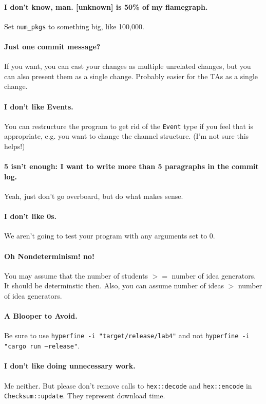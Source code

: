 \paragraph{I don't know, man. [unknown] is 50\% of my flamegraph.} Set \texttt{num\_pkgs} to something big, like 100,000.

\paragraph{Just one commit message?} If you want, you can cast your changes as multiple unrelated changes, but you can also 
present them as a single change. Probably easier for the TAs as a single change.

\paragraph{I don't like Events.} You can restructure the program to get rid of the \texttt{Event} type if you feel that is
appropriate, e.g. you want to change the channel structure. (I'm not sure this helps!)

\paragraph{5 isn't enough: I want to write more than 5 paragraphs in the commit log.} Yeah, just don't go overboard, but do
what makes sense.

\paragraph{I don't like 0s.} We aren't going to test your program with any arguments set to 0.

\paragraph{Oh Nondeterminism! no!} You may assume that the number of students $>=$ number of idea generators.
It should be determinstic then. Also, you can assume number of ideas $>$ number of idea generators.

\paragraph{A Blooper to Avoid.} Be sure to use \texttt{hyperfine -i "target/release/lab4"} and not 
\texttt{hyperfine -i "cargo run --release"}.

\paragraph{I don't like doing unnecessary work.} Me neither. But please don't remove calls to \texttt{hex::decode} and \texttt{hex::encode} in \texttt{Checksum::update}. They represent download time.

